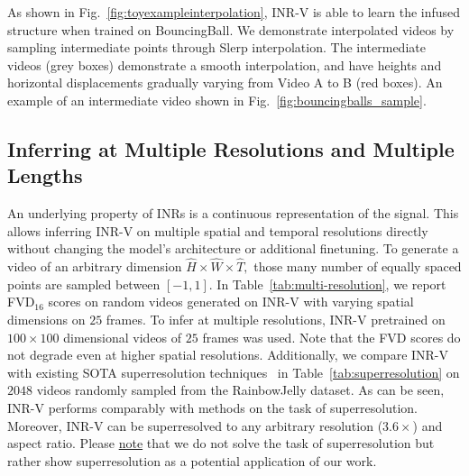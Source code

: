 \documentclass[10pt]{article} \usepackage[accepted]{tmlr}
\begin{document}
As shown in Fig.~\ref{fig:toyexampleinterpolation}, INR-V is able to learn the infused structure when trained on BouncingBall. We demonstrate interpolated videos by sampling intermediate points through Slerp interpolation. The intermediate videos (grey boxes) demonstrate a smooth interpolation, and have heights and horizontal displacements gradually varying from Video A to B (red boxes). An example of an intermediate video shown in Fig.~\ref{fig:bouncingballs_sample}. 


\subsection{Inferring at Multiple Resolutions and Multiple Lengths}
\label{sec:appendix-superresolution}



An underlying property of INRs is a continuous representation of the signal. This allows inferring INR-V on multiple spatial and temporal resolutions directly without changing the model's architecture or additional finetuning. To generate a video of an arbitrary dimension $\hat{H} \times \hat{W} \times \hat{T},$ those many number of equally spaced points are sampled between $[-1, 1]$. In Table~\ref{tab:multi-resolution}, we report FVD$_{16}$ scores on random videos generated on INR-V with varying spatial dimensions on $25$ frames. To infer at multiple resolutions, INR-V pretrained on $100\times100$ dimensional videos of $25$ frames was used. Note that the FVD scores do not degrade even at higher spatial resolutions. Additionally, we compare INR-V with existing SOTA superresolution techniques~\cite{videoinr} in Table~\ref{tab:superresolution} on $2048$ videos randomly sampled from the RainbowJelly dataset. 
As can be seen, INR-V performs comparably with methods on the task of superresolution. Moreover, INR-V can be superresolved to any arbitrary resolution ($3.6\times$) and aspect ratio. Please \underline{note} that we do not solve the task of superresolution but rather show superresolution as a potential application of our work. 
\end{document}
